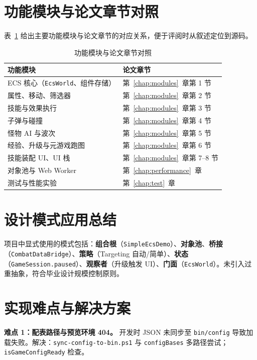 \section{功能模块与论文章节对照}

表~\ref{tab:module-chapter-map} 给出主要功能模块与论文章节的对应关系，便于评阅时从叙述定位到源码。

\begin{table}[htbp]
  \centering
  \caption{功能模块与论文章节对照}
  \label{tab:module-chapter-map}
  \begin{tabular}{p{4.0cm}p{8.5cm}}
    \toprule
    \textbf{功能模块} & \textbf{论文章节} \\
    \midrule
    ECS 核心（\texttt{EcsWorld}、组件存储） & 第~\ref{chap:modules}~章第 1 节 \\
    属性、移动、筛选器 & 第~\ref{chap:modules}~章第 2 节 \\
    技能与效果执行 & 第~\ref{chap:modules}~章第 3 节 \\
    子弹与碰撞 & 第~\ref{chap:modules}~章第 4 节 \\
    怪物 AI 与波次 & 第~\ref{chap:modules}~章第 5 节 \\
    经验、升级与元游戏跑图 & 第~\ref{chap:modules}~章第 6 节 \\
    技能装配 UI、UI 栈 & 第~\ref{chap:modules}~章第 7--8 节 \\
    对象池与 Web Worker & 第~\ref{chap:performance}~章 \\
    测试与性能实验 & 第~\ref{chap:test}~章 \\
    \bottomrule
  \end{tabular}
\end{table}

\section{设计模式应用总结}

项目中显式使用的模式包括：\textbf{组合根}（\texttt{SimpleEcsDemo}）、\textbf{对象池}、\textbf{桥接}（\texttt{CombatDataBridge}）、\textbf{策略}（Targeting 自动/简单）、\textbf{状态}（\texttt{GameSession.paused}）、\textbf{观察者}（升级触发 UI）、\textbf{门面}（\texttt{EcsWorld}）。未引入过重抽象，符合毕业设计规模控制原则。

\section{实现难点与解决方案}

\textbf{难点 1：配表路径与预览环境 404。} 开发时 JSON 未同步至 \texttt{bin/config} 导致加载失败。解决：\texttt{sync-config-to-bin.ps1} 与 \texttt{configBases} 多路径尝试；\texttt{isGameConfigReady} 检查。

